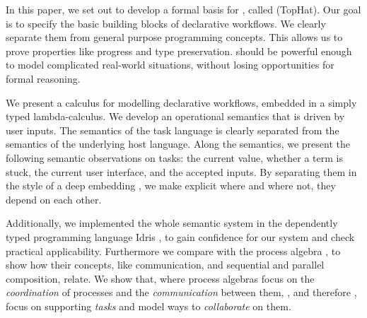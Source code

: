 


In this paper, we set out to develop a formal basis for \TOP, called \TOPHAT (TopHat).
Our goal is to specify the basic building blocks of declarative workflows.
We clearly separate them from general purpose programming concepts.
This allows us to prove properties like progress and type preservation.
\TOPHAT should be powerful enough to model complicated real-world situations,
without losing opportunities for formal reasoning.


We present a calculus for modelling declarative workflows, embedded in a simply typed lambda-calculus.
We develop an operational semantics that is driven by user inputs.
The semantics of the task language is clearly separated from the semantics of the underlying host language.
Along the semantics, we present the following semantic observations on tasks: the current value, whether a term is stuck, the current user interface, and the accepted inputs.
By separating them in the style of a deep embedding \cite{conf/cefp/Gibbons13}, we make explicit where and where not, they depend on each other.

Additionally, we implemented the whole semantic system in the dependently typed programming language Idris \cite{journals/jfp/Brady13},
to gain confidence for our system and check practical applicability.
Furthermore we compare \TOPHAT  with the process algebra \CSP, to show how their concepts, like communication, and sequential and parallel composition, relate.
We show that, where process algebras focus on the \emph{coordination} of processes and the \emph{communication} between them,
\TOP, and therefore \TOPHAT, focus on supporting \emph{tasks} and model ways to \emph{collaborate} on them.




